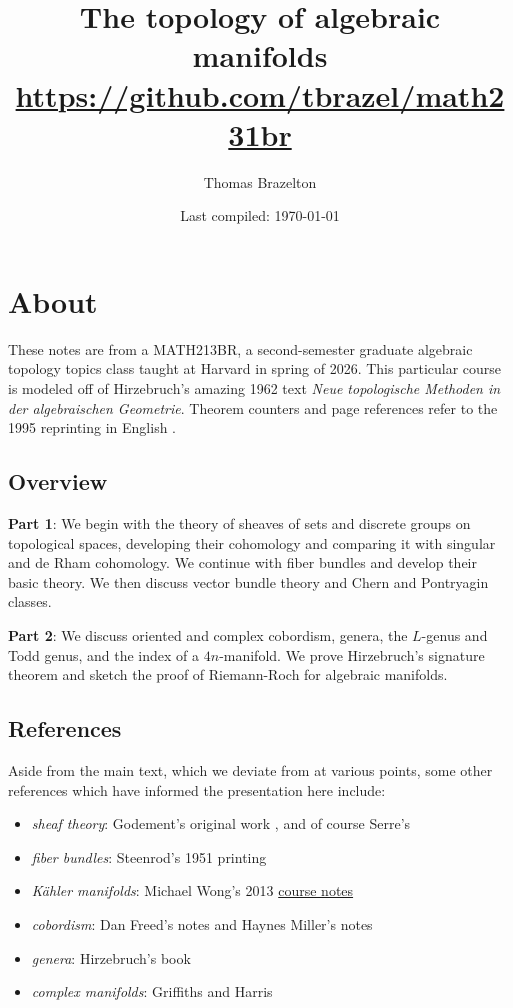 \documentclass[11pt]{book}
\title{The topology of algebraic manifolds \\
\url{https://github.com/tbrazel/math231br}}
\author{Thomas Brazelton}
\date{Last compiled: \today}
\begin{document}

\maketitle

\section{About}

These notes are from a MATH213BR, a second-semester graduate algebraic topology topics class taught at Harvard in spring of 2026. This particular course is modeled off of Hirzebruch's amazing 1962 text \emph{Neue topologische Methoden in der algebraischen Geometrie}. Theorem counters and page references refer to the 1995 reprinting in English \cite{Hirzebruch}.

\subsection{Overview}

\textbf{Part 1}: We begin with the theory of sheaves of sets and discrete groups on topological spaces, developing their cohomology and comparing it with singular and de Rham cohomology. We continue with fiber bundles and develop their basic theory. We then discuss vector bundle theory and Chern and Pontryagin classes. 

\textbf{Part 2}: We discuss oriented and complex cobordism, genera, the $L$-genus and Todd genus, and the index of a $4n$-manifold. We prove Hirzebruch's signature theorem and sketch the proof of Riemann-Roch for algebraic manifolds.


\subsection{References}
Aside from the main text, which we deviate from at various points, some other references which have informed the presentation here include:
\begin{itemize}
    \item \emph{sheaf theory}: Godement's original work \cite{godementTopologieAlgebriqueTheorie1958}, and of course Serre's \cite{FAC}
    \item \emph{fiber bundles}: Steenrod's 1951 printing \cite{Steenrod-fibre-bundles}
    \item \emph{K\"{a}hler manifolds}: Michael Wong's 2013 \href{https://wiki.epfl.ch/kaehler2013/notesexercises}{course notes}
    \item \emph{cobordism}: Dan Freed's notes \cite{Freed-bordism} and Haynes Miller's notes \cite{millerNotesCobordism}
    \item \emph{genera}: Hirzebruch's book \cite{MMF}
    \item \emph{complex manifolds}: Griffiths and Harris \cite{griffithsPrinciplesAlgebraicGeometry1978}
\end{itemize}
\end{document}
